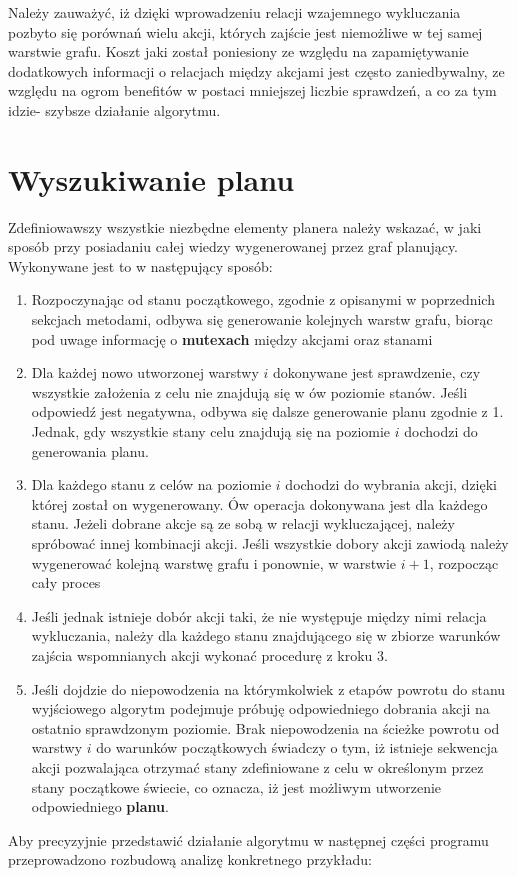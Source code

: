    Należy zauważyć, iż dzięki wprowadzeniu relacji wzajemnego wykluczania pozbyto się porównań wielu akcji, których zajście jest niemożliwe w tej samej 
    warstwie grafu. Koszt jaki został poniesiony ze względu na zapamiętywanie dodatkowych informacji o relacjach między akcjami jest często zaniedbywalny,
    ze względu na ogrom benefitów w postaci mniejszej liczbie sprawdzeń, a co za tym idzie- szybsze działanie algorytmu.


\section{Wyszukiwanie planu}
    Zdefiniowawszy wszystkie niezbędne elementy planera należy wskazać, w jaki sposób przy posiadaniu całej wiedzy wygenerowanej przez graf planujący.
    Wykonywane jest to w następujący sposób:
    \begin{enumerate}
        \item Rozpoczynając od stanu początkowego, zgodnie z opisanymi w poprzednich sekcjach metodami, odbywa się generowanie kolejnych warstw grafu,
        biorąc pod uwage informację o \textbf{mutexach} między akcjami oraz stanami
        \item Dla każdej nowo utworzonej warstwy $i$ dokonywane jest sprawdzenie, czy wszystkie założenia z celu nie znajdują się 
        w ów poziomie stanów. Jeśli odpowiedź jest negatywna, odbywa się dalsze generowanie planu zgodnie z 1. Jednak, gdy 
        wszystkie stany celu znajdują się na poziomie $i$ dochodzi do generowania planu.
        \item Dla każdego stanu z celów na poziomie $i$ dochodzi do wybrania akcji, dzięki której został on wygenerowany. 
        Ów operacja dokonywana jest dla każdego stanu. Jeżeli dobrane akcje są ze sobą w relacji wykluczającej, należy spróbować innej 
        kombinacji akcji. Jeśli wszystkie dobory akcji zawiodą należy wygenerować kolejną warstwę grafu i ponownie, w warstwie $i+1$, rozpocząc cały proces
        \item Jeśli jednak istnieje dobór akcji taki, że nie występuje między nimi relacja wykluczania, należy dla każdego stanu 
        znajdującego się w zbiorze warunków zajścia wspomnianych akcji wykonać procedurę z kroku 3. 
        \item Jeśli dojdzie do niepowodzenia na którymkolwiek z etapów powrotu do stanu wyjściowego algorytm podejmuje próbuję odpowiedniego dobrania 
        akcji na ostatnio sprawdzonym poziomie. Brak niepowodzenia na ścieżke powrotu od warstwy $i$ do warunków początkowych świadczy o tym, 
        iż istnieje sekwencja akcji pozwalająca otrzymać stany zdefiniowane z celu w określonym przez stany początkowe świecie, co oznacza, 
        iż jest możliwym utworzenie odpowiedniego \textbf{planu}.
    \end{enumerate}
    Aby precyzyjnie przedstawić działanie algorytmu w następnej części programu przeprowadzono rozbudową analizę konkretnego przykładu:

